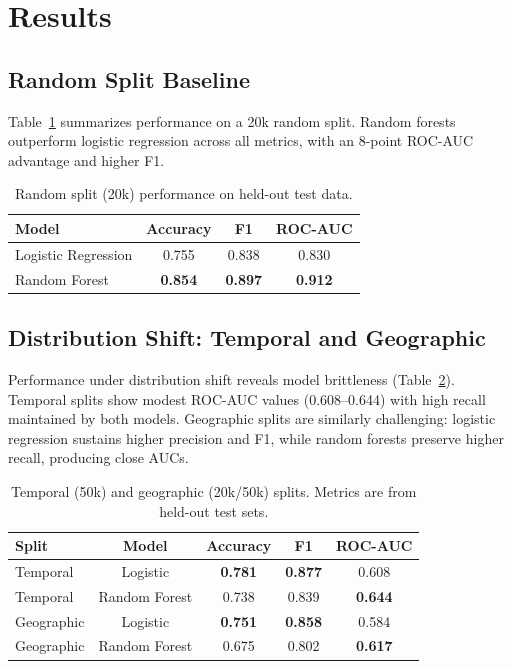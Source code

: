 \documentclass[sigconf]{acmart}
\begin{document}
\section{Results}
\subsection{Random Split Baseline}
Table~\ref{tab:random} summarizes performance on a 20k random split. Random forests outperform logistic regression across all metrics, with an 8-point ROC-AUC advantage and higher F1.

\begin{table}[t]
    \centering
    \caption{Random split (20k) performance on held-out test data.}
    \label{tab:random}
    \begin{tabular}{lccc}
        \toprule
        Model & Accuracy & F1 & ROC-AUC \\
        \midrule
        Logistic Regression & 0.755 & 0.838 & 0.830 \\
        Random Forest & \textbf{0.854} & \textbf{0.897} & \textbf{0.912} \\
        \bottomrule
    \end{tabular}
\end{table}

\subsection{Distribution Shift: Temporal and Geographic}
Performance under distribution shift reveals model brittleness (Table~\ref{tab:shift}). Temporal splits show modest ROC-AUC values (0.608--0.644) with high recall maintained by both models. Geographic splits are similarly challenging: logistic regression sustains higher precision and F1, while random forests preserve higher recall, producing close AUCs.

\begin{table}[t]
    \centering
    \caption{Temporal (50k) and geographic (20k/50k) splits. Metrics are from held-out test sets.}
    \label{tab:shift}
    \begin{tabular}{lcccc}
        \toprule
        Split & Model & Accuracy & F1 & ROC-AUC \\
        \midrule
        Temporal & Logistic & \textbf{0.781} & \textbf{0.877} & 0.608 \\
        Temporal & Random Forest & 0.738 & 0.839 & \textbf{0.644} \\
        Geographic & Logistic & \textbf{0.751} & \textbf{0.858} & 0.584 \\
        Geographic & Random Forest & 0.675 & 0.802 & \textbf{0.617} \\
        \bottomrule
    \end{tabular}
\end{table}
\end{document}
